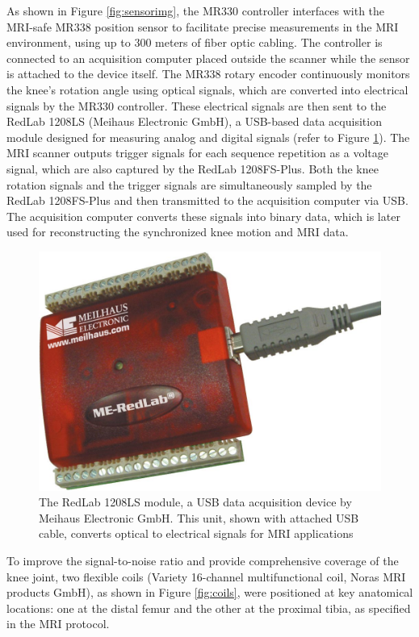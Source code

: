\documentclass{micro-econ-thesis}
\begin{document}
As shown in Figure \ref{fig:sensorimg}, the MR330 controller interfaces with the MRI-safe MR338 position sensor to facilitate precise measurements in the MRI environment, using up to 300 meters of fiber optic cabling. The controller is connected to an acquisition computer placed outside the scanner while the sensor is attached to the device itself. The MR338 rotary encoder continuously monitors the knee's rotation angle using optical signals, which are converted into electrical signals by the MR330 controller. These electrical signals are then sent to the RedLab 1208LS (Meihaus Electronic GmbH), a USB-based data acquisition module designed for measuring analog and digital signals (refer to Figure \ref{fig:redlab}). The MRI scanner outputs trigger signals for each sequence repetition as a voltage signal, which are also captured by the RedLab 1208FS-Plus. Both the knee rotation signals and the trigger signals are simultaneously sampled by the RedLab 1208FS-Plus and then transmitted to the acquisition computer via USB. The acquisition computer converts these signals into binary data, which is later used for reconstructing the synchronized knee motion and MRI data.  
\begin{figure}[H]
	\centering
	\includegraphics[scale=0.1]{redlab}
	\caption{The RedLab 1208LS module, a USB data acquisition device by Meihaus Electronic GmbH. This unit, shown with attached USB cable, converts optical to electrical signals for MRI applications}
	\label{fig:redlab}
\end{figure}




To improve the signal-to-noise ratio and provide comprehensive coverage of the knee joint, two flexible coils (Variety 16-channel multifunctional coil, Noras MRI products GmbH), as shown in Figure \ref{fig:coils}, were positioned at key anatomical locations: one at the distal femur and the other at the proximal tibia, as specified in the MRI protocol. 
\end{document}
